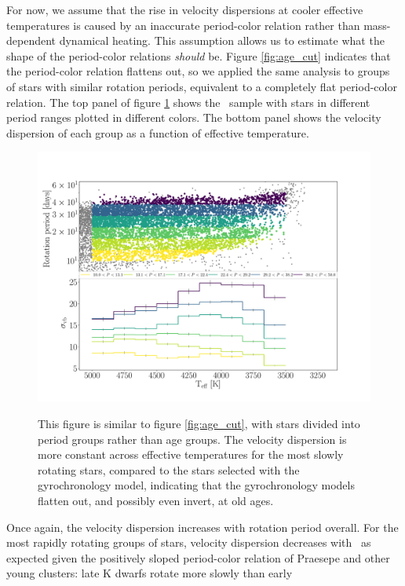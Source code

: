 For now, we assume that the rise in velocity dispersions at cooler effective
temperatures is caused by an inaccurate period-color relation rather than
mass-dependent dynamical heating.
This assumption allows us to estimate what the shape of the period-color
relations {\it should} be.
Figure \ref{fig:age_cut} indicates that the period-color relation flattens
out, so we applied the same analysis to groups of stars with similar rotation
periods, equivalent to a completely flat period-color relation.
The top panel of figure \ref{fig:period_cut} shows the \mct\ sample with stars
in different period ranges plotted in different colors.
The bottom panel shows the velocity dispersion of each group as a function of
effective temperature.
\begin{figure}
  \caption{
This figure is similar to figure \ref{fig:age_cut}, with stars divided into
    period groups rather than age groups.
The velocity dispersion is more constant across effective temperatures for the
    most slowly rotating stars, compared to the stars selected with the
    \citet{angus2019} gyrochronology model, indicating that the gyrochronology
    models flatten out, and possibly even invert, at old ages.
}
  \centering
    \includegraphics[width=1\textwidth]{period_cut}
\label{fig:period_cut}
\end{figure}
Once again, the velocity dispersion increases with rotation period overall.
For the most rapidly rotating groups of stars, velocity dispersion decreases
with \teff\ as expected given the positively sloped period-color relation of
Praesepe and other young clusters: late K dwarfs rotate more slowly than early

